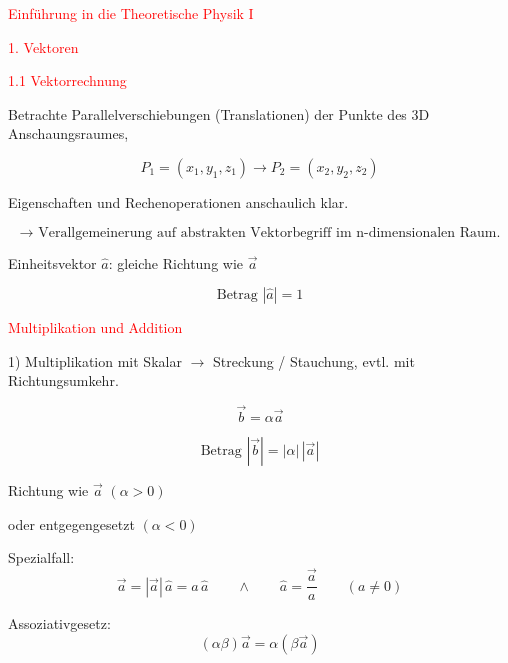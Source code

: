 \documentclass[a4paper,12pt]{article}
\begin{document}
{\LARGE\textcolor{red}{Einführung in die Theoretische Physik I}}

\vspace{1em}

{\Large\textcolor{red}{1. Vektoren}}

{\Large\textcolor{red}{1.1 Vektorrechnung}}

Betrachte Parallelverschiebungen (Translationen) der Punkte des 3D Anschaungsraumes,

\[
P_1=(x_1,y_1,z_1) \longrightarrow P_2=(x_2,y_2,z_2)
\]

Eigenschaften und Rechenoperationen anschaulich klar.

\[
\to \text{ Verallgemeinerung auf abstrakten Vektorbegriff im n-dimensionalen Raum.}
\]

\begin{center}
\end{center}

\newpage

Einheitsvektor $\hat{a}$: gleiche Richtung wie $\vec{a}$

\[
\text{Betrag } |\hat{a}|=1
\]

{\Large\textcolor{red}{Multiplikation und Addition}}

1) Multiplikation mit Skalar $\to$ Streckung / Stauchung, evtl. mit Richtungsumkehr.

\[
\vec{b}=\alpha \vec{a}
\]

\[
\text{Betrag } |\vec{b}| = |\alpha|\,|\vec{a}|
\]

Richtung wie $\vec{a}$ \qquad $(\alpha > 0)$

oder entgegengesetzt \qquad $(\alpha < 0)$

Spezialfall:
\[
\vec{a}=|\vec{a}|\,\hat{a} = a\,\hat{a}
\qquad \wedge \qquad
\hat{a}=\frac{\vec{a}}{a}
\qquad (a\neq 0)
\]

Assoziativgesetz:
\[
(\alpha\beta)\vec{a}=\alpha(\beta\vec{a})
\]
\end{document}
